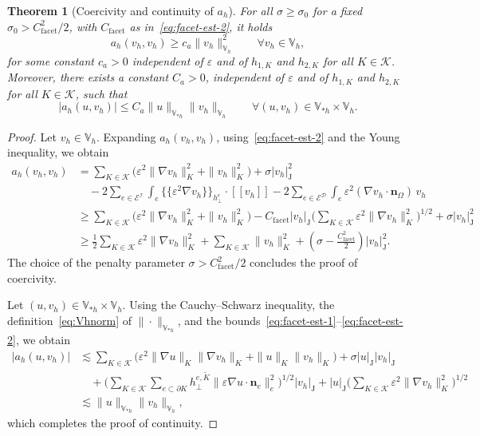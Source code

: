 \documentclass[a4paper,twoside,10pt]{article}
\newtheorem{theorem}{Theorem}[section]
\newcommand{\Vsh}{V_{\!\star \hspace*{-0.2mm}h}}
\newcommand*{\abs}[1]{\left|#1\right|}
\newcommand{\jmp}[1]{[\![ #1 ]\!]}
\newcommand{\eps}{\varepsilon}
\newcommand{\calD}{\mathcal{D}}
\newcommand{\calE}{\mathcal{E}}
\newcommand{\calI}{\mathcal{I}}
\newcommand{\calK}{\mathcal{K}}
\newcommand{\bn}{\mathbf{n}}
\numberwithin{equation}{section}
\newcommand{\Vh}{\mathbb{V}_{\! h}}
\renewcommand{\Vsh}{\mathbb{V}_{*h}}
\newcommand{\hperp}{h_{\perp}}
\newcommand{\Kt}{\widetilde{K}}
\newcommand{\hKot}{h_{1,K}}
\newcommand{\hKtt}{h_{2,K}}
\newcommand{\mvl}[1]{\{\!\!\{#1\}\!\!\}}
\begin{document}
	\begin{theorem}[Coercivity and continuity of $a_h$]\label{thm:global}
    For all $\sigma \geq \sigma_0$ for a fixed $\sigma_0 > C_{\mathrm{facet}}^2/2$, with $C_{\mathrm{facet}}$ as in~\eqref{eq:facet-est-2}, it holds
	\begin{equation*}
	a_h(v_h,v_h)\ge c_a \|v_h\|_{\Vh}^2
	\qquad\forall v_h\in\Vh,
	\end{equation*}
	for some constant $c_a>0$ independent of $\eps$ and of $\hKot$ and $\hKtt$ for all $K\in\calK$.
	Moreover, there exists a constant $C_a>0$,  independent of $\eps$ and of $\hKot$  and $\hKtt$ for all $K\in\calK$, such that
		\begin{equation*}
	|a_h(u,v_h)|\le C_a \|u\|_{\Vsh}\|v_h\|_{\Vh}
		\qquad\forall (u,v_h)\in \Vsh\times \Vh.
		\end{equation*}
	\end{theorem}
	\begin{proof}
	Let $v_h\in\Vh$. Expanding $a_h(v_h,v_h)$, using~\eqref{eq:facet-est-2} and the Young inequality, we obtain
	\begin{align*}
	a_h(v_h,v_h)
	&=
	\sum_{K\in\calK}\Big(\eps^2\|\nabla v_h\|_{K}^2+\|v_h\|_{K}^2\Big)
	+\sigma \abs{v_h}_{\mathrm{J}}^2
	\\
	&\quad
	-2\sum_{e\in\calE^{\calI}}\int_e \mvl{\eps^2\nabla v_h}_{\hperp^e}\cdot \jmp{v_h}
	-2\sum_{e\in\calE^{\calD}}\int_e \eps^2(\nabla v_h\cdot \bn_\Omega)\,v_h
	\\
	&\ge
	\sum_{K\in\calK}\Big(\eps^2\|\nabla v_h\|_{K}^2+\|v_h\|_{K}^2\Big)
	-C_{\mathrm{facet}} \abs{v_h}_{\mathrm{J}}
	\Bigg(\sum_{K\in\calK}\eps^2\|\nabla v_h\|_{K}^2\Bigg)^{1/2}
	+\sigma \abs{v_h}_{\mathrm{J}}^2
	\\
	& \ge\frac{1}{2}\sum_{K\in\calK}\eps^2\|\nabla v_h\|_{K}^2
	+\sum_{K\in\calK}\|v_h\|_{K}^2
	+\left(\sigma - \frac{C_{\mathrm{facet}}^2}{2}\right)|v_h|_{\mathrm{J}}^2.
	\end{align*}
	The choice of the penalty parameter $\sigma > C_{\mathrm{facet}}^2/2$ concludes the proof of coercivity.

    
	Let $(u,v_h)\in \Vsh\times \Vh$. Using the Cauchy--Schwarz inequality, the definition~\eqref{eq:Vhnorm} of $\|\cdot\|_{\Vsh}$,
	and the bounds~\eqref{eq:facet-est-1}--\eqref{eq:facet-est-2}, we obtain
	\begin{align*}
	|a_h(u,v_h)|
	& \lesssim
	\sum_{K\in\calK}
	\Big(
	\eps^2\|\nabla u\|_{K}\|\nabla v_h\|_{K}
	+\|u\|_{K}\|v_h\|_{K}
	\Big)
	+\sigma |u|_{\mathrm{J}} |v_h|_{\mathrm{J}}
	\\
	&\quad
	+\Bigg(
	\sum_{K\in\calK}\sum_{e\subset\partial K}
	h_\perp^{e,\Kt}
	\|\eps \nabla u\cdot \bn_e\|_{e}^2
	\Bigg)^{1/2}
	|v_h|_{\mathrm{J}}
	+ |u|_{\mathrm{J}}
	\Bigg(\sum_{K\in\calK}\eps^2\|\nabla v_h\|_{K}^2
	\Bigg)^{1/2}
	\\
	&\lesssim \|u\|_{\Vsh}\|v_h\|_{\Vh},
	\end{align*}
    which completes the proof of continuity.
	\end{proof}
	
\end{document}
